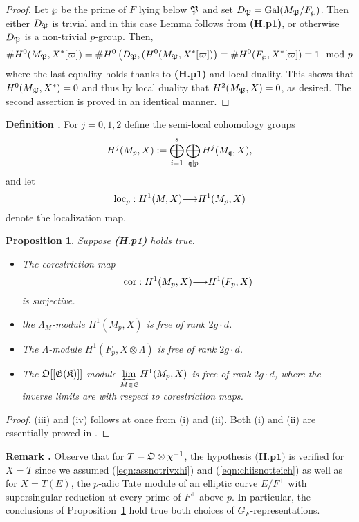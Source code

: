 \documentclass[12pt]{amsart}
\numberwithin{equation}{section}
\newenvironment{define}{\par\medskip\noindent\refstepcounter{thm}
\bgroup{\hspace*{-0.15 cm}\bf{Definition}
\thethm.}\bgroup}{\egroup \egroup\par\medskip}
\newtheorem{prop}[thm]{Proposition}
\newenvironment{rem}{\par\medskip\noindent\refstepcounter{thm}
\bgroup{\hspace*{-0.15 cm}\bf{Remark} \thethm.}\bgroup}{\egroup
\egroup\par\medskip} \parskip 2pt
\begin{document}
\begin{proof}
Let $\wp$ be the prime of $F$ lying below $\frak{P}$ and set $D_\frak{P}=\textup{Gal}(M_\frak{P}/F_\wp)$. Then either $D_\frak{P}$ is trivial and in this case  Lemma follows from \textup{\textbf{(H.p1)}}, or otherwise $D_\frak{P}$ is a non-trivial $p$-group. Then,
$$\# H^0(M_{\frak{P}},X^*[\varpi])= \# H^0\left(D_{\frak{P}}, (H^0(M_{\frak{P}},X^*[\varpi])\right)\equiv \#H^0(F_\wp,X^*[\varpi]) \equiv 1 \mod p$$
where the last equality holds thanks to \textup{\textbf{(H.p1)}} and local duality. This shows that $ H^0(M_{\frak{P}},X^*)=0$ and thus by local duality that $H^2(M_{\frak{P}},X)=0$, as desired. The second assertion is proved in an identical manner.
\end{proof}
\begin{define}
\label{def:pmsemilocal}
For $j=0,1,2$ define the semi-local cohomology groups
$$H^j(M_{p},X):=\bigoplus_{i=1}^s \bigoplus_{\frak{q}|p}H^j(M_{\frak{q}},X),$$
and let
$$\textup{loc}_p: H^1(M,X){\longrightarrow} H^1(M_{p},X)$$
denote the localization map.
\end{define}

 

 

 
 
 
 
 
  
 
  

\begin{prop}
\label{prop:localfull} Suppose \textup{\textbf{(H.p1)}} holds true.
\begin{itemize}
\item[(i)]  The corestriction map
$$\textup{cor}: H^1(M_p,X){\longrightarrow} H^1(F_p,X)$$
is surjective.
\item[(ii)] the ${\Lambda}_M$-module $H^1(M_{p},X)$ is free of rank $2g\cdot d$.
\item[(iii)] The ${\Lambda}$-module $H^1(F_p,X\otimes{\Lambda})$ is free of rank $2g\cdot d$.
\item[(iv)] The $\frak{O}[[\frak{G}(\frak{K})]]$-module $\displaystyle{\varprojlim_{M\in \frak{E}}H^1(M_{p},X)}$ is free of rank $2g\cdot d$, where the inverse limits are with respect to corestriction maps.
\end{itemize}
\end{prop}

\begin{proof}
(iii) and (iv) follows at once from (i) and (ii). Both (i) and (ii) are essentially proved in \cite[\S2.1]{kbbCMabvar}.
\end{proof}
\begin{rem}
Observe that for $T=\frak{O}\otimes\chi^{-1}$, the hypothesis $\textbf{(H.p1)}$ is verified for $X=T$ since we assumed 
(\ref{eqn:assnotrivxhi}) and (\ref{eqn:chiisnotteich}) as well as for $X=T(E)$, the $p$-adic Tate module of an elliptic curve $E/F^+$ with supersingular reduction at every prime of $F^+$ above $p$. In particular, the conclusions of Proposition~\ref{prop:localfull} hold true both choices of $G_F$-representations.
\end{rem}
\end{document}
